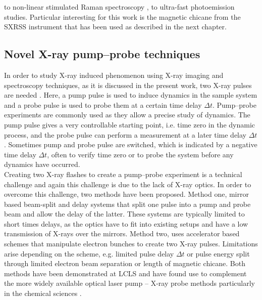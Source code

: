 to non-linear stimulated Raman spectroscopy \citep{Kimberg-2016-FD}, to ultra-fast photoemission studies. Particular interesting for this work is the magnetic chicane from the SXRSS instrument that has been used as described in the next chapter.
%
%
%
%
\subsection{Novel X-ray pump–probe techniques}\label{sec:novel-pump--probe-tech}
In order to study X-ray induced phenomenon using X-ray imaging and spectroscopy techniques, as it is discussed in the present work, two X-ray pulses are needed . Here, a pump pulse is used to induce dynamics in the sample system and a probe pulse is used to probe them at a certain time delay $\Delta t$. Pump--probe experiments are commonly used as they allow a precise study of dynamics. The pump pulse gives a very controllable starting point, i.e. time zero in the dynamic process, and the probe pulse can perform a measurement at a later time delay $\Delta t$. Sometimes pump and probe pulse are switched, which is indicated by a negative time delay $\Delta t$, often to verify time zero or to probe the system before any dynamics have occurred.\\
Creating two X-ray flashes to create a pump--probe experiment is a technical challenge and again this challenge is due to the lack of X-ray optics. In order to overcome this challenge, two methods have been proposed. Method one, mirror based beam-split and delay systems \citep{Castagna-2013-JPCS,Murphy-2012-SPIE} that split one pulse into a pump and probe beam and allow the delay of the latter. These systems are typically limited to short times delays, as the optics have to fit into existing setups and have a low transmission of X-rays over the mirrors. Method two, uses accelerator based schemes \citep{Lutman-2013-PRL,Marinelli-2015-NatComm} that manipulate electron bunches to create two X-ray pulses. Limitations arise depending on the scheme, e.g. limited pulse delay $\Delta t$ or pulse energy split through limited electron beam separation or length of magnetic chicane. Both methods have been demonstrated at LCLS and have found use to complement the more widely available optical laser pump -- X-ray probe methods particularly in the chemical sciences \cite{Picon-2016-NatComm,Ferguson-2016-SciAdv,Liekhus-Schmaltz-2015-NatComm}.\\
